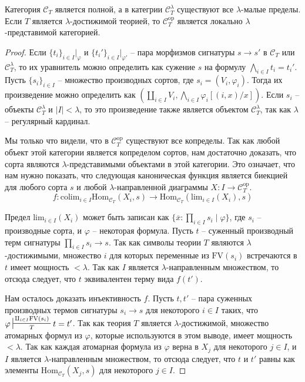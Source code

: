 \documentclass[reqno]{amsart}
\theoremstyle{definition}
\theoremstyle{remark}
\newcommand{\cat}[1]{\mathcal{#1}}
\newcommand{\fs}[1]{\mathrm{#1}}
\newcommand{\Hom}{\fs{Hom}}
\newcommand{\FV}{\fs{FV}}
\begin{document}
\begin{prop}
Категория $\cat{C}_T$ является полной, а в категрии $\cat{C}_T^\lambda$ существуют все $\lambda$-малые пределы.
Если $T$ является $\lambda$-достижимой теорией, то $\cat{C}_T^\fs{op}$ является локально $\lambda$-представимой категорией.
\end{prop}
\begin{proof}
Если $\{ t_i \}_{i \in I}|_\varphi$ и $\{ t_i' \}_{i \in I}|_{\varphi'}$ -- пара морфизмов сигнатуры $s \to s'$ в $\cat{C}_T$ или $\cat{C}_T^\lambda$,
то их уравнитель можно определить как сужение $s$ на формулу $\bigwedge_{i \in I} t_i = t_i'$.
Пусть $\{ s_i \}_{i \in I}$ -- множество производных сортов, где $s_i = (V_i,\varphi_i)$.
Тогда их произведение можно определить как $(\coprod_{i \in I} V_i, \bigwedge_{i \in I} \varphi_i[(i,x)/x])$.
Если $s_i$ -- объекты $\cat{C}_T^\lambda$ и $|I| < \lambda$, то это произведение также является объектом $\cat{C}_T^\lambda$, так как $\lambda$ -- регулярный кардинал.

Мы только что видели, что в $\cat{C}_T^\fs{op}$ существуют все копределы.
Так как любой объект этой категории является копределом сортов, нам достаточно доказать, что сорта являются $\lambda$-представимыми объектами в этой категории.
Это означает, что нам нужно показать, что следующая каноническая функция является биекцией для любого сорта $s$ и любой $\lambda$-направленной диаграммы $X : I \to \cat{C}_T^\fs{op}$.
\[ f : \fs{colim}_{i \in I} \Hom_{\cat{C}_T}(X_i, s) \to \Hom_{\cat{C}_T}(\fs{lim}_{i \in I}(X_i), s) \]

Предел $\fs{lim}_{i \in I}(X_i)$ может быть записан как $\{ \overline{x} : \prod_{i \in I} s_i \mid \varphi \}$, где $s_i$ -- производные сорта, и $\varphi$ -- некоторая формула.
Пусть $t$ -- суженный производный терм сигнатуры $\prod_{i \in I} s_i \to s$.
Так как символы теории $T$ являются $\lambda$-достижимыми, множество $i$ для которых переменные из $\FV(s_i)$ встречаются в $t$ имеет мощность $< \lambda$.
Так как $I$ является $\lambda$-направленным множеством, то отсюда следует, что $t$ эквивалентен терму вида $f(t')$.

Нам осталось доказать инъективность $f$.
Пусть $t,t'$ -- пара суженных производных термов сигнатуры $s_i \to s$ для некоторого $i \in I$ таких, что $\varphi \sststile{T}{\amalg_{i \in I} \FV(s_i)} t = t'$.
Так как теория $T$ является $\lambda$-достижимой, множество атомарных формул из $\varphi$, которые используются в этом выводе, имеет мощность $< \lambda$.
Так как каждая атомарная формула из $\varphi$ верна в $X_j$ для некоторого $j \in I$, и $I$ является $\lambda$-направленным множеством, то отсюда следует, что $t$ и $t'$ равны как элементы $\Hom_{\cat{C}_T}(X_j, s)$ для некоторого $j \in I$.
\end{proof}
\end{document}
